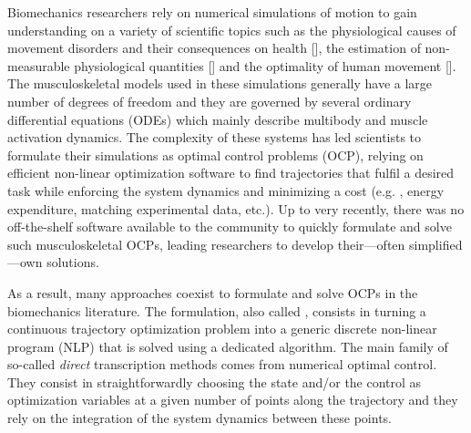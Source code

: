 Biomechanics researchers rely on numerical simulations of motion to gain understanding on a variety of scientific topics such as the physiological causes of movement disorders and their consequences on health [\addref], the estimation of non-measurable physiological quantities [\addref] and the optimality of human movement [\addref].
The musculoskeletal models used in these simulations generally have a large number of degrees of freedom and they are governed by several ordinary differential equations (ODEs) which mainly describe multibody and muscle activation dynamics.
The complexity of these systems has led scientists to formulate their simulations as optimal control problems (OCP), relying on efficient non-linear optimization software to find trajectories that fulfil a desired task while enforcing the system dynamics and minimizing a cost (e.g. , energy expenditure, matching experimental data, etc.).
Up to very recently, there was no off-the-shelf software available to the community to quickly formulate and solve such musculoskeletal OCPs, leading researchers to develop their---often simplified---own solutions.


As a result, many approaches coexist to formulate and solve OCPs in the biomechanics literature. 
The formulation, also called , consists in turning a continuous trajectory optimization problem into a generic discrete non-linear program (NLP) that is solved using a dedicated algorithm. 
The main family of so-called \textit{direct} transcription methods comes from numerical optimal control. 
They consist in straightforwardly choosing the state and/or the control as optimization variables at a given number of points along the trajectory and they rely on the integration of the system dynamics between these points. 

